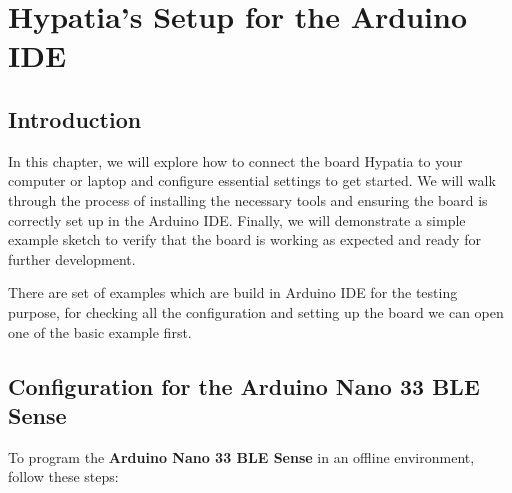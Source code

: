 %
%


\chapter{Hypatia's Setup for the Arduino IDE}

\section{Introduction}

In this chapter, we will explore how to connect the board Hypatia to your computer or laptop and configure essential settings to get started. We will walk through the process of installing the necessary tools and ensuring the board is correctly set up in the Arduino IDE. Finally, we will demonstrate a simple example sketch to verify that the board is working as expected and ready for further development.


There are set of examples which are build in Arduino IDE for the testing purpose, for checking all the configuration and setting up the board we can open one of the basic example  first.


\section{Configuration for the Arduino Nano 33 BLE Sense}



To program the \textbf{Arduino Nano 33 BLE Sense} in an offline environment, follow these steps:

